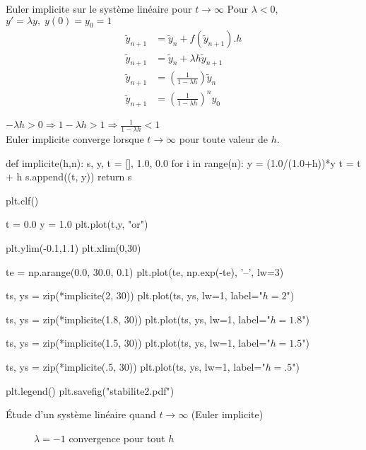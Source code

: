 \documentclass{beamer}
\begin{document}
\begin{frame}{Euler implicite sur le système linéaire pour $t \rightarrow \infty$}
    Pour $\lambda < 0$,  $y'=\lambda y,\; y(0) = y_0 = 1$
    \vfill
    \begin{align*}
        \widetilde{y}_{n+1} & =  \widetilde{y}_n + f(\widetilde{y}_{n+1}).h     \\
        \widetilde{y}_{n+1} & =  \widetilde{y}_n + \lambda h\widetilde{y}_{n+1} \\
        \widetilde{y}_{n+1} & =    (\frac{1}{1-\lambda h})\widetilde{y}_{n}     \\
        \widetilde{y}_{n+1} & =  \left(\frac{1}{1-\lambda h} \right)^n y_0
    \end{align*}

    $-\lambda h > 0 \Rightarrow 1-\lambda h > 1 \Rightarrow \frac{1}{1-\lambda h} < 1$ \\
    Euler implicite converge lorsque $t \rightarrow \infty$ pour toute valeur de $h$.
\end{frame}

\begin{pycode}

    def implicite(h,n):
        s, y, t = [], 1.0, 0.0
        for i in range(n):
            y = (1.0/(1.0+h))*y
            t = t + h
            s.append((t, y))
        return s

    plt.clf()

    t = 0.0
    y = 1.0
    plt.plot(t,y, "or")

    plt.ylim(-0.1,1.1)
    plt.xlim(0,30)

    te = np.arange(0.0, 30.0, 0.1)
    plt.plot(te, np.exp(-te), '--', lw=3)

    ts, ys = zip(*implicite(2, 30))
    plt.plot(ts, ys, lw=1, label="$h=2$")

    ts, ys = zip(*implicite(1.8, 30))
    plt.plot(ts, ys, lw=1, label="$h=1.8$")

    ts, ys = zip(*implicite(1.5, 30))
    plt.plot(ts, ys, lw=1, label="$h=1.5$")

    ts, ys = zip(*implicite(.5, 30))
    plt.plot(ts, ys, lw=1, label="$h=.5$")

    plt.legend()
    plt.savefig("stabilite2.pdf")
\end{pycode}

\begin{frame}{Étude d'un système linéaire quand $t \rightarrow \infty$ (Euler implicite)}
    \begin{figure}
        \caption{$\lambda=-1$ convergence pour tout $h$}
    \end{figure}
\end{frame}
\end{document}
